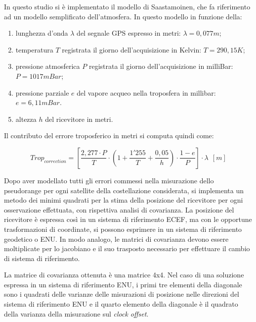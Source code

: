 \documentclass[a4paper,11pt,twoside]{book}
\begin{document}
\begin{itemize}[-]
		In questo studio si è implementato il modello di Saastamoinen, che fa riferimento ad un modello semplificato dell'atmosfera. In questo modello in funzione della:
		
		\begin{enumerate}
			\item lunghezza d'onda $\lambda$ del segnale GPS espresso in metri: $\lambda = 0,077m$;
			
			\item temperatura $T$ registrata il giorno dell'acquisizione in Kelvin: $T = 290,15K$;
			
			\item pressione atmosferica $P$ registrata il giorno dell'acquisizione in milliBar: $P = 1017mBar$;
			
			\item pressione parziale $e$ del vapore acqueo nella troposfera in millibar: $e = 6,11mBar$.
			
			\item altezza $h$ del ricevitore in metri.
		\end{enumerate}
	
		Il contributo del errore troposferico in metri si computa quindi come:
		
		\begin{equation}
			Trop_{correction} = \left[  \frac{2,277 \cdot P}{T} \cdot \left( 1 +  \frac{1'255}{T} + \frac{0,05}{h} \right) \cdot \frac{1 - e}{P}\right] \cdot \lambda \ \ [m]
		\end{equation}
	\end{itemize}

	Dopo aver modellato tutti gli errori commessi nella misurazione dello pseudorange per ogni satellite della costellazione considerata, si implementa un metodo dei minimi quadrati per la stima della posizione del ricevitore per ogni osservazione effettuata, con rispettiva analisi di covarianza. La posizione del ricevitore è espressa così in un sistema di riferimento ECEF, ma con le opportune trasformazioni di coordinate, si possono esprimere in un sistema di riferimento geodetico o ENU. In modo analogo, le matrici di covarianza devono essere moltiplicate per lo jacobiano e il suo trasposto necessario per effettuare il cambio di sistema di riferimento.
	
	La matrice di covarianza ottenuta è una matrice 4x4. Nel caso di una soluzione espressa in un sistema di riferimento ENU, i primi tre elementi della diagonale sono i quadrati delle varianze delle misurazioni di posizione nelle direzioni del sistema di riferimento ENU e il quarto elemento della diagonale è il quadrato della varianza della misurazione sul \textit{clock offset}.
	
\end{document}
